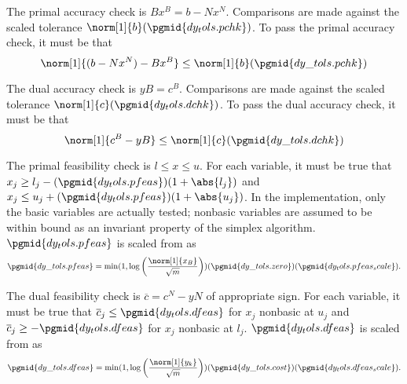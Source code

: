 The primal accuracy check is $B x^B = b - N x^N$.
Comparisons are made against the scaled tolerance
$\norm[1]{b}(\pgmid{dy_tols.pchk})$.
To pass the primal accuracy check, it must be that
\begin{equation*}
\norm[1]{(b - N x^N) - B x^B} \leq \norm[1]{b}(\pgmid{dy\_tols.pchk})
\end{equation*}

The dual accuracy check is $y B = c^B$.
Comparisons are made against the scaled tolerance
$\norm[1]{c}(\pgmid{dy_tols.dchk})$.
To pass the dual accuracy check, it must be that
\begin{equation*}
\norm[1]{c^B - y B} \leq \norm[1]{c}(\pgmid{dy\_tols.dchk})
\end{equation*}

The primal feasibility check is $l \leq x \leq u$.
For each variable, it must be true that
$x_j \geq l_j - (\pgmid{dy_tols.pfeas}) (1 + \abs{l_j})$ and
$x_j \leq u_j + (\pgmid{dy_tols.pfeas}) (1 + \abs{u_j})$.
In the implementation, only the basic variables are actually tested; nonbasic
variables are assumed to be within bound as an invariant property of the
simplex algorithm.
$\pgmid{dy_tols.pfeas}$ is scaled from  as
\begin{equation*}
\pgmid{dy\_tols.pfeas} =
  \min ( 1, \log \left( \frac{\norm[1]{x_B}}{\sqrt{m}} \right))
  (\pgmid{dy\_tols.zero})(\pgmid{dy_tols.pfeas_scale}).
\end{equation*}

The dual feasibility check is $\overline{c} = c^N - y N$ of appropriate
sign.
For each variable, it must be true that
$\overline{c}_j \leq \pgmid{dy_tols.dfeas}$ for $x_j$ nonbasic
at $u_j$ and $\overline{c}_j \geq -\pgmid{dy_tols.dfeas}$ for $x_j$ nonbasic
at $l_j$.
$\pgmid{dy_tols.dfeas}$ is scaled from  as
\begin{equation*}
\pgmid{dy\_tols.dfeas} =
  \min ( 1, \log \left( \frac{\norm[1]{y_k}}{\sqrt{m}} \right))
  (\pgmid{dy\_tols.cost})(\pgmid{dy_tols.dfeas_scale}).
\end{equation*}
